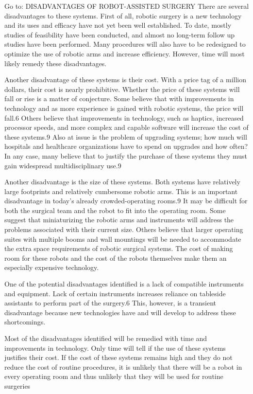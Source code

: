 Go to:
DISADVANTAGES OF ROBOT-ASSISTED SURGERY
There are several disadvantages to these systems. First of all, robotic surgery is a new technology and its uses and efficacy have not yet been well established. To date, mostly studies of feasibility have been conducted, and almost no long-term follow up studies have been performed. Many procedures will also have to be redesigned to optimize the use of robotic arms and increase efficiency. However, time will most likely remedy these disadvantages.

Another disadvantage of these systems is their cost. With a price tag of a million dollars, their cost is nearly prohibitive. Whether the price of these systems will fall or rise is a matter of conjecture. Some believe that with improvements in technology and as more experience is gained with robotic systems, the price will fall.6 Others believe that improvements in technology, such as haptics, increased processor speeds, and more complex and capable software will increase the cost of these systems.9 Also at issue is the problem of upgrading systems; how much will hospitals and healthcare organizations have to spend on upgrades and how often? In any case, many believe that to justify the purchase of these systems they must gain widespread multidisciplinary use.9

Another disadvantage is the size of these systems. Both systems have relatively large footprints and relatively cumbersome robotic arms. This is an important disadvantage in today’s already crowded-operating rooms.9 It may be difficult for both the surgical team and the robot to fit into the operating room. Some suggest that miniaturizing the robotic arms and instruments will address the problems associated with their current size. Others believe that larger operating suites with multiple booms and wall mountings will be needed to accommodate the extra space requirements of robotic surgical systems. The cost of making room for these robots and the cost of the robots themselves make them an especially expensive technology.

One of the potential disadvantages identified is a lack of compatible instruments and equipment. Lack of certain instruments increases reliance on tableside assistants to perform part of the surgery.6 This, however, is a transient disadvantage because new technologies have and will develop to address these shortcomings.

Most of the disadvantages identified will be remedied with time and improvements in technology. Only time will tell if the use of these systems justifies their cost. If the cost of these systems remains high and they do not reduce the cost of routine procedures, it is unlikely that there will be a robot in every operating room and thus unlikely that they will be used for routine surgeries

